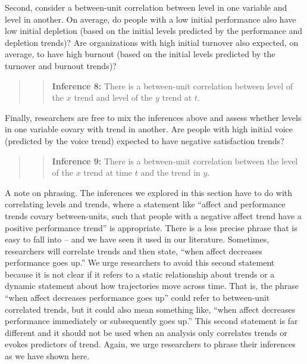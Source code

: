 \documentclass[english,,man]{apa6}
\begin{document}
Second, consider a between-unit correlation between level in one variable and level in another. On average, do people with a low initial performance also have low initial depletion (based on the initial levels predicted by the performance and depletion trends)? Are organizations with high initial turnover also expected, on average, to have high burnout (based on the initial levels predicted by the turnover and burnout trends)?

\begin{quote}
\begin{quote}
\textbf{Inference 8:} There is a between-unit correlation between level of the \(x\) trend and level of the \(y\) trend at \(t\).
\end{quote}
\end{quote}

Finally, researchers are free to mix the inferences above and assess whether levels in one variable covary with trend in another. Are people with high initial voice (predicted by the voice trend) expected to have negative satisfaction trends?

\begin{quote}
\begin{quote}
\textbf{Inference 9:} There is a between-unit correlation between the level of the \(x\) trend at time \(t\) and the trend in \(y\).
\end{quote}
\end{quote}

A note on phrasing. The inferences we explored in this section have to do with correlating levels and trends, where a statement like \enquote{affect and performance trends covary between-units, such that people with a negative affect trend have a positive performance trend} is appropriate. There is a less precise phrase that is easy to fall into -- and we have seen it used in our literature. Sometimes, researchers will correlate trends and then state, \enquote{when affect decreases performance goes up.} We urge researchers to avoid this second statement because it is not clear if it refers to a static relationship about trends or a dynamic statement about how trajectories move across time. That is, the phrase \enquote{when affect decreases performance goes up} could refer to between-unit correlated trends, but it could also mean something like, \enquote{when affect decreases performance immediately or subsequently goes up.} This second statement is far different and it should not be used when an analysis only correlates trends or evokes predictors of trend. Again, we urge researchers to phrase their inferences as we have shown here.
\end{document}
